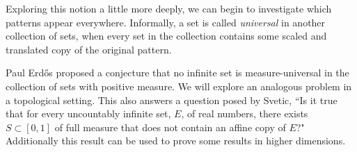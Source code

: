 Exploring this notion a little more deeply, we can begin to investigate which patterns appear everywhere.  Informally, a set is called \textit{universal} in another collection of sets, when every set in the collection contains some scaled and translated copy of the original pattern.  

  Paul Erd\H{o}s proposed a conjecture that no infinite set is measure-universal in  the collection of sets with positive measure.  We will explore an analogous problem in a topological setting.   This also answers a question posed by Svetic\cite{Svetic}, ``Is it true that for every uncountably infinite set, $E$, of real numbers, there exists $S \subset [0,1]$ of full measure that does not contain an affine copy of $E$?"  Additionally this result can be used to prove some results in higher dimensions.  






